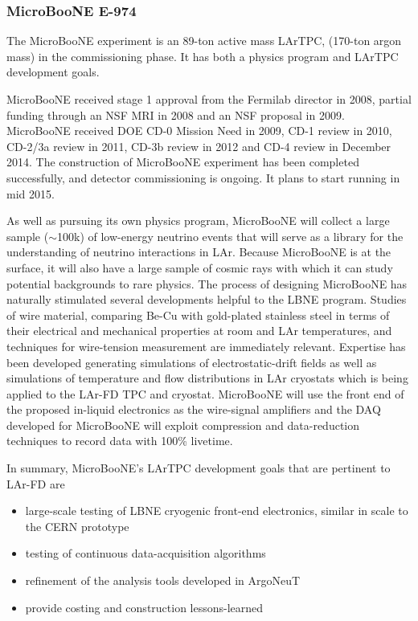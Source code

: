 \subsubsection {MicroBooNE E-974}

The MicroBooNE experiment is an 89-ton active mass LArTPC, (170-ton argon mass) in the commissioning phase.  It has both a physics program and LArTPC development goals.  

MicroBooNE received stage 1 approval from the Fermilab director in 2008, partial funding through an NSF MRI in 2008 and an NSF proposal in 2009.  MicroBooNE received DOE CD-0 Mission Need in 2009, CD-1 review in 2010, CD-2/3a review in 2011, CD-3b review in 2012 and CD-4 review in December 2014. The construction of MicroBooNE experiment has been completed successfully, and detector commissioning is ongoing. It plans to start running in mid 2015. 

As well as pursuing its own physics program, MicroBooNE will collect a large sample ($\sim$100k) of low-energy neutrino events that will serve as a library for the understanding of neutrino interactions in 
LAr. Because MicroBooNE is at the surface, it will also have a large sample of cosmic rays with which it can study potential backgrounds to rare physics. The process of designing MicroBooNE has naturally stimulated several developments helpful to the LBNE program.  Studies of wire material, comparing Be-Cu with gold-plated stainless steel in terms of their electrical and mechanical properties at room and LAr temperatures, and techniques for wire-tension measurement are immediately relevant. Expertise has been developed generating simulations of electrostatic-drift fields as well as simulations of temperature and flow distributions in LAr cryostats which is being applied to the LAr-FD TPC and cryostat. MicroBooNE will use the front end of the proposed in-liquid electronics as the wire-signal amplifiers and the DAQ developed for MicroBooNE will exploit compression and data-reduction techniques to record data with 100\% livetime.

\noindent  In summary, MicroBooNE's LArTPC development goals that are pertinent to LAr-FD are
\begin{itemize}
\item large-scale testing of LBNE cryogenic front-end electronics, similar in scale to the CERN prototype
\item testing of continuous data-acquisition algorithms
\item refinement of the analysis tools developed in ArgoNeuT
\item provide costing and construction lessons-learned
\end{itemize}

